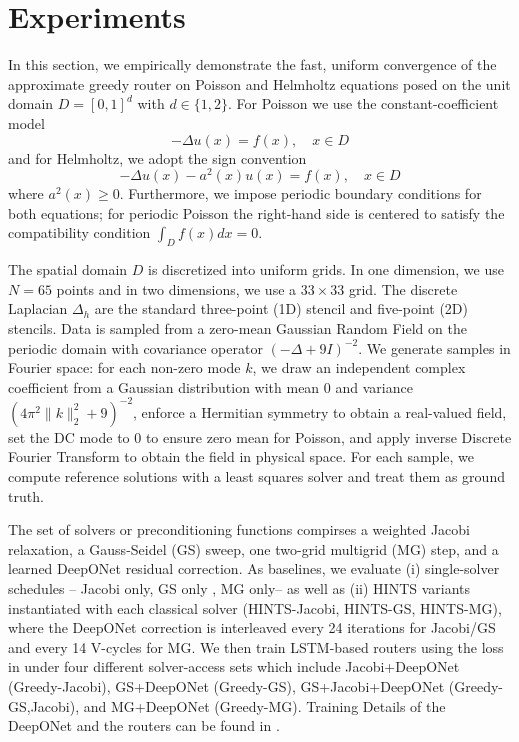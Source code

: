 \documentclass{article} %
\begin{document}
\section{Experiments}\label{section:experiments}

In this section, we empirically demonstrate the fast, uniform convergence of the approximate greedy router on Poisson and Helmholtz equations posed on the unit domain $D = [0, 1]^d$ with $d\in \{1, 2\}$. For Poisson we use the constant-coefficient model
$$- \Delta u(x) = f(x), \quad x\in D$$ and for Helmholtz, we adopt the sign convention 
$$-\Delta u(x) - a^2(x)u(x) = f(x), \quad x\in D$$ where $a^2(x) \geq 0$. Furthermore, we impose periodic boundary conditions for both equations; for periodic Poisson the right-hand side is centered to satisfy the compatibility condition $\int_D f(x)dx = 0$.

The spatial domain $D$ is discretized into uniform grids. In one dimension, we use $N = 65$ points and in two dimensions, we use a $33 \times 33$ grid. The discrete Laplacian $\Delta_h$ are the standard three-point (1D) 
stencil and five-point (2D) 
stencils. Data is sampled from a zero-mean Gaussian Random Field on the periodic domain with covariance operator $(- \Delta + 9I)^{-2}$. We generate samples in Fourier space: for each non-zero mode $k$, we draw an independent complex coefficient from a Gaussian distribution with mean 0 and variance $(4\pi^2 \|k\|^2_2 + 9)^{-2}$, enforce a Hermitian symmetry to obtain a real-valued field, set the DC mode to $0$ to ensure zero mean for Poisson, and apply inverse Discrete Fourier Transform to obtain the field in physical space. For each sample, we compute reference solutions with a least squares solver and treat them as ground truth.  

The set of solvers or preconditioning functions compirses a weighted Jacobi relaxation, a Gauss-Seidel (GS) sweep, one two-grid  multigrid (MG) step, and a learned DeepONet residual correction. As baselines, we evaluate (i) single-solver schedules -- Jacobi only, GS only , MG only-- as well as (ii) HINTS variants instantiated with each classical solver (HINTS-Jacobi, HINTS-GS, HINTS-MG), where the DeepONet correction is interleaved every 24 iterations for Jacobi/GS and every 14 V-cycles for MG. We then train LSTM-based routers using the loss in  under four different solver-access sets which include Jacobi+DeepONet (Greedy-Jacobi), GS+DeepONet (Greedy-GS), GS+Jacobi+DeepONet (Greedy-GS,Jacobi), and MG+DeepONet (Greedy-MG). Training Details of the DeepONet and the routers can be found in .
\end{document}
